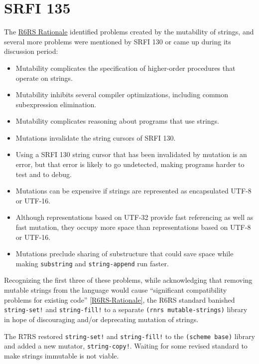 \section{SRFI 135}

The \protect\hyperlink{R6RS-Rationale}{R6RS Rationale} identified
problems created by the mutability of strings, and several more problems
were mentioned by SRFI 130 or came up during its discussion period:

\begin{itemize}
\tightlist
\item
  Mutability complicates the specification of higher-order procedures
  that operate on strings.
\item
  Mutability inhibits several compiler optimizations, including common
  subexpression elimination.
\item
  Mutability complicates reasoning about programs that use strings.
\item
  Mutations invalidate the string cursors of SRFI 130.
\item
  Using a SRFI 130 string cursor that has been invalidated by mutation
  is an error, but that error is likely to go undetected, making
  programs harder to test and to debug.
\item
  Mutations can be expensive if strings are represented as encapsulated
  UTF-8 or UTF-16.
\item
  Although representations based on UTF-32 provide fast referencing as
  well as fast mutation, they occupy more space than representations
  based on UTF-8 or UTF-16.
\item
  Mutations preclude sharing of substructure that could save space while
  making \texttt{substring} and \texttt{string-append} run faster.
\end{itemize}

Recognizing the first three of these problems, while acknowledging that
removing mutable strings from the language would cause ``significant
compatibility problems for existing code''
\protect\hyperlink{R6RS-Rationale}{{[}R6RS-Rationale{]}}, the R6RS
standard banished \texttt{string-set!} and \texttt{string-fill!} to a
separate \texttt{(rnrs\ mutable-strings)} library in hope of
discouraging and/or deprecating mutation of strings.

The R7RS restored \texttt{string-set!} and \texttt{string-fill!} to the
\texttt{(scheme\ base)} library and added a new mutator,
\texttt{string-copy!}. Waiting for some revised standard to make strings
immutable is not viable.

